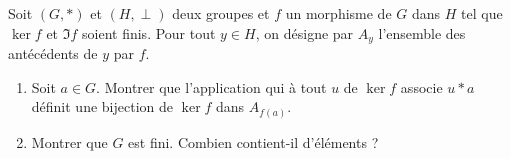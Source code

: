 Soit $(G,*)$ et $(H,\perp)$ deux groupes et $f$ un morphisme de $G$ dans $H$ tel que $\ker f$ et $\Im f$ soient finis. Pour tout $y\in H$, on désigne par $A_y$ l'ensemble des antécédents de $y$ par $f$.
\begin{enumerate}
 \item Soit $a\in G$. Montrer que l'application qui à tout $u$ de $\ker f$ associe $u*a$ définit une bijection de $\ker f$ dans $A_{f(a)}$.
\item Montrer que $G$ est fini. Combien contient-il d'éléments ?
\end{enumerate}
